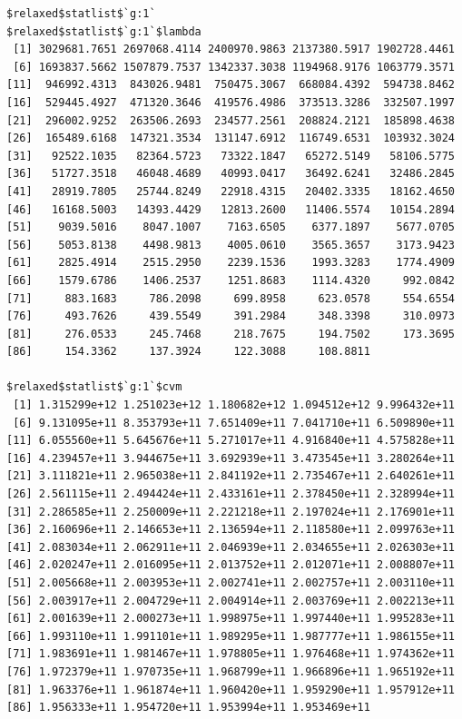 \documentclass[
]{article}
\begin{document}
\begin{verbatim}
$relaxed$statlist$`g:1`
$relaxed$statlist$`g:1`$lambda
 [1] 3029681.7651 2697068.4114 2400970.9863 2137380.5917 1902728.4461
 [6] 1693837.5662 1507879.7537 1342337.3038 1194968.9176 1063779.3571
[11]  946992.4313  843026.9481  750475.3067  668084.4392  594738.8462
[16]  529445.4927  471320.3646  419576.4986  373513.3286  332507.1997
[21]  296002.9252  263506.2693  234577.2561  208824.2121  185898.4638
[26]  165489.6168  147321.3534  131147.6912  116749.6531  103932.3024
[31]   92522.1035   82364.5723   73322.1847   65272.5149   58106.5775
[36]   51727.3518   46048.4689   40993.0417   36492.6241   32486.2845
[41]   28919.7805   25744.8249   22918.4315   20402.3335   18162.4650
[46]   16168.5003   14393.4429   12813.2600   11406.5574   10154.2894
[51]    9039.5016    8047.1007    7163.6505    6377.1897    5677.0705
[56]    5053.8138    4498.9813    4005.0610    3565.3657    3173.9423
[61]    2825.4914    2515.2950    2239.1536    1993.3283    1774.4909
[66]    1579.6786    1406.2537    1251.8683    1114.4320     992.0842
[71]     883.1683     786.2098     699.8958     623.0578     554.6554
[76]     493.7626     439.5549     391.2984     348.3398     310.0973
[81]     276.0533     245.7468     218.7675     194.7502     173.3695
[86]     154.3362     137.3924     122.3088     108.8811

$relaxed$statlist$`g:1`$cvm
 [1] 1.315299e+12 1.251023e+12 1.180682e+12 1.094512e+12 9.996432e+11
 [6] 9.131095e+11 8.353793e+11 7.651409e+11 7.041710e+11 6.509890e+11
[11] 6.055560e+11 5.645676e+11 5.271017e+11 4.916840e+11 4.575828e+11
[16] 4.239457e+11 3.944675e+11 3.692939e+11 3.473545e+11 3.280264e+11
[21] 3.111821e+11 2.965038e+11 2.841192e+11 2.735467e+11 2.640261e+11
[26] 2.561115e+11 2.494424e+11 2.433161e+11 2.378450e+11 2.328994e+11
[31] 2.286585e+11 2.250009e+11 2.221218e+11 2.197024e+11 2.176901e+11
[36] 2.160696e+11 2.146653e+11 2.136594e+11 2.118580e+11 2.099763e+11
[41] 2.083034e+11 2.062911e+11 2.046939e+11 2.034655e+11 2.026303e+11
[46] 2.020247e+11 2.016095e+11 2.013752e+11 2.012071e+11 2.008807e+11
[51] 2.005668e+11 2.003953e+11 2.002741e+11 2.002757e+11 2.003110e+11
[56] 2.003917e+11 2.004729e+11 2.004914e+11 2.003769e+11 2.002213e+11
[61] 2.001639e+11 2.000273e+11 1.998975e+11 1.997440e+11 1.995283e+11
[66] 1.993110e+11 1.991101e+11 1.989295e+11 1.987777e+11 1.986155e+11
[71] 1.983691e+11 1.981467e+11 1.978805e+11 1.976468e+11 1.974362e+11
[76] 1.972379e+11 1.970735e+11 1.968799e+11 1.966896e+11 1.965192e+11
[81] 1.963376e+11 1.961874e+11 1.960420e+11 1.959290e+11 1.957912e+11
[86] 1.956333e+11 1.954720e+11 1.953994e+11 1.953469e+11


\end{verbatim}
\end{document}
